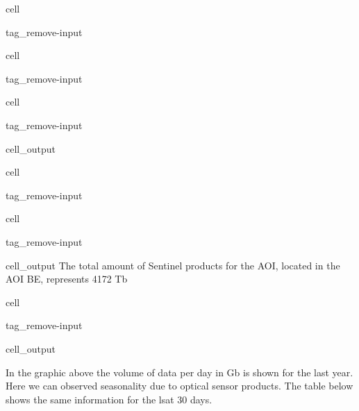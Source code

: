 \documentclass[letterpaper,10pt,english]{jupyterBook}
\begin{document}
\begin{sphinxuseclass}{cell}
\begin{sphinxuseclass}{tag_remove-input}
\end{sphinxuseclass}
\end{sphinxuseclass}
\begin{sphinxuseclass}{cell}
\begin{sphinxuseclass}{tag_remove-input}
\end{sphinxuseclass}
\end{sphinxuseclass}
\begin{sphinxuseclass}{cell}
\begin{sphinxuseclass}{tag_remove-input}\begin{sphinxVerbatimOutput}

\begin{sphinxuseclass}{cell_output}
\end{sphinxuseclass}\end{sphinxVerbatimOutput}

\end{sphinxuseclass}
\end{sphinxuseclass}
\begin{sphinxuseclass}{cell}
\begin{sphinxuseclass}{tag_remove-input}
\end{sphinxuseclass}
\end{sphinxuseclass}
\begin{sphinxuseclass}{cell}
\begin{sphinxuseclass}{tag_remove-input}\begin{sphinxVerbatimOutput}

\begin{sphinxuseclass}{cell_output}
\sphinxAtStartPar
The total amount of Sentinel products for the AOI, located in the AOI BE, represents 4172 Tb

\end{sphinxuseclass}\end{sphinxVerbatimOutput}

\end{sphinxuseclass}
\end{sphinxuseclass}
\begin{sphinxuseclass}{cell}
\begin{sphinxuseclass}{tag_remove-input}\begin{sphinxVerbatimOutput}

\begin{sphinxuseclass}{cell_output}
\noindent{}

\end{sphinxuseclass}\end{sphinxVerbatimOutput}

\end{sphinxuseclass}
\end{sphinxuseclass}
\sphinxAtStartPar
In the graphic above the volume of data per day in Gb is shown for the last year. Here we can observed seasonality due to optical sensor products. The table below shows the same information for the lsat 30 days.
\end{document}
